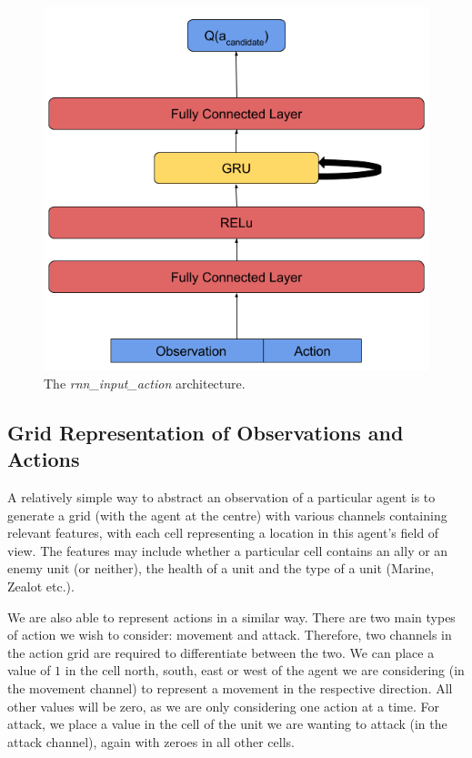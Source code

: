 \begin{figure}
    \centering
    \includegraphics[scale=0.3]{images/agent_diagrams/rnn_input_action_agent_diagram.png}
    \caption{The \textit{rnn\_input\_action} architecture.}
    \label{fig:rnn_input_action_agent_diagram}
\end{figure}

\subsection{Grid Representation of Observations and Actions}

A relatively simple way to abstract an observation of a particular agent is to generate a grid (with the agent at the centre) with various channels containing relevant features, with each cell representing a location in this agent's field of view. The features may include whether a particular cell contains an ally or an enemy unit (or neither), the health of a unit and the type of a unit (Marine, Zealot etc.). 

We are also able to represent actions in a similar way. There are two main types of action we wish to consider: movement and attack. Therefore, two channels in the action grid are required to differentiate between the two. We can place a value of $1$ in the cell north, south, east or west of the agent we are considering (in the movement channel) to represent a movement in the respective direction. All other values will be zero, as we are only considering one action at a time. For attack, we place a value in the cell of the unit we are wanting to attack (in the attack channel), again with zeroes in all other cells.

